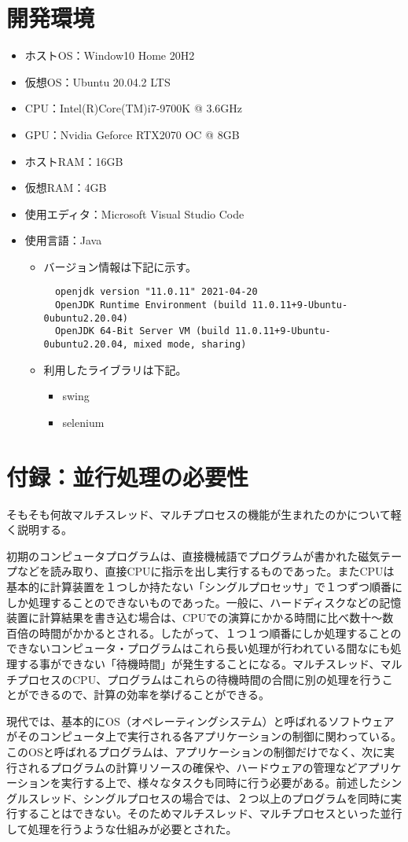 \documentclass[dvipdfmx, titlepage]{jsarticle}
\begin{document}
\section{開発環境}
\begin{itemize}
  \item ホストOS：Window10 Home 20H2
  \item 仮想OS：Ubuntu 20.04.2 LTS
  \item CPU：Intel(R)Core(TM)i7-9700K @ 3.6GHz
  \item GPU：Nvidia Geforce RTX2070 OC @ 8GB
  \item ホストRAM：16GB
  \item 仮想RAM：4GB
  \item 使用エディタ：Microsoft Visual Studio Code
  \item 使用言語：Java
  \begin{itemize}
    \item バージョン情報は下記に示す。
    \begin{verbatim}
  openjdk version "11.0.11" 2021-04-20
  OpenJDK Runtime Environment (build 11.0.11+9-Ubuntu-0ubuntu2.20.04)
  OpenJDK 64-Bit Server VM (build 11.0.11+9-Ubuntu-0ubuntu2.20.04, mixed mode, sharing)
    \end{verbatim}
    \item 利用したライブラリは下記。
    \begin{itemize}
      \item swing
      \item selenium
    \end{itemize}
  \end{itemize}
\end{itemize}
\section{付録：並行処理の必要性}
そもそも何故マルチスレッド、マルチプロセスの機能が生まれたのかについて軽く説明する。\par
初期のコンピュータプログラムは、直接機械語でプログラムが書かれた磁気テープなどを読み取り、直接CPUに指示を出し実行するものであった。またCPUは基本的に計算装置を１つしか持たない「シングルプロセッサ」で１つずつ順番にしか処理することのできないものであった。一般に、ハードディスクなどの記憶装置に計算結果を書き込む場合は、CPUでの演算にかかる時間に比べ数十〜数百倍の時間がかかるとされる。したがって、１つ１つ順番にしか処理することのできないコンピュータ・プログラムはこれら長い処理が行われている間なにも処理する事ができない「待機時間」が発生することになる。マルチスレッド、マルチプロセスのCPU、プログラムはこれらの待機時間の合間に別の処理を行うことができるので、計算の効率を挙げることができる。\par
現代では、基本的にOS（オペレーティングシステム）と呼ばれるソフトウェアがそのコンピュータ上で実行される各アプリケーションの制御に関わっている。このOSと呼ばれるプログラムは、アプリケーションの制御だけでなく、次に実行されるプログラムの計算リソースの確保や、ハードウェアの管理などアプリケーションを実行する上で、様々なタスクも同時に行う必要がある。前述したシングルスレッド、シングルプロセスの場合では、２つ以上のプログラムを同時に実行することはできない。そのためマルチスレッド、マルチプロセスといった並行して処理を行うような仕組みが必要とされた。
\end{document}
